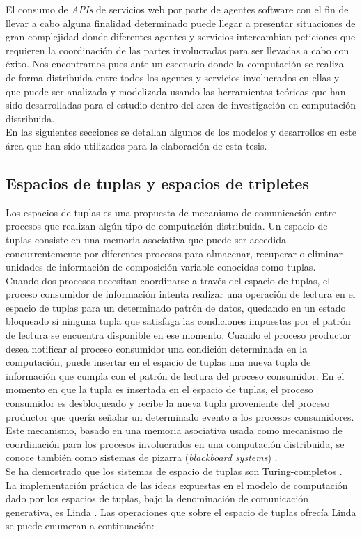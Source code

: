 El consumo de \textit{APIs} de servicios web por parte de agentes software con el fin de llevar a cabo alguna finalidad determinado puede llegar a presentar situaciones de gran complejidad donde diferentes agentes y servicios intercambian peticiones que requieren la coordinaci\'on de las partes involucradas para ser llevadas a cabo con \'exito. Nos encontramos pues ante un escenario donde la computaci\'on se realiza de forma distribuida entre todos los agentes y servicios involucrados en ellas y que puede ser analizada y modelizada usando las herramientas te\'oricas que han sido desarrolladas para el estudio dentro del area de investigaci\'on en computaci\'on distribuida.\\
En las siguientes secciones se detallan algunos de los modelos y desarrollos en este \'area que han sido utilizados para la elaboraci\'on de esta tesis.\\

\subsection{Espacios de tuplas y espacios de tripletes}

Los espacios de tuplas \cite{bussler2005minimal} es una propuesta de mecanismo de comunicaci\'on entre procesos que realizan alg\'un tipo de computaci\'on distribuida. Un espacio de tuplas consiste en una memoria asociativa que puede ser accedida concurrentemente por diferentes procesos para almacenar, recuperar o eliminar unidades de informaci\'on de composici\'on variable conocidas como tuplas.\\
Cuando dos procesos necesitan coordinarse a trav\'es del espacio de tuplas, el proceso consumidor de informaci\'on intenta realizar una operaci\'on de lectura en el espacio de tuplas para un determinado patr\'on de datos, quedando en un estado bloqueado si ninguna tupla que satisfaga las condiciones impuestas por el patr\'on de lectura se encuentra disponible en ese momento. Cuando el proceso productor desea notificar al proceso consumidor una condici\'on determinada en la computaci\'on, puede insertar en el espacio de tuplas una nueva tupla de informaci\'on que cumpla con el patr\'on de lectura del proceso consumidor. En el momento en que la tupla es insertada en el espacio de tuplas, el proceso consumidor es desbloqueado y recibe la nueva tupla proveniente del proceso productor que quer\'ia se\~nalar un determinado evento a los procesos consumidores. Este mecanismo, basado en una memoria asociativa usada como mecanismo de coordinaci\'on para los procesos involucrados en una computaci\'on distribuida, se conoce tambi\'en como sistemas de pizarra (\textit{blackboard systems}) \cite{nii1986blackboard}.\\
Se ha demostrado que los sistemas de espacio de tuplas son Turing-completos \cite{busi2000expressiveness}. La implementaci\'on pr\'actica de las ideas expuestas en el modelo de computaci\'on dado por los espacios de tuplas, bajo la denominaci\'on de comunicaci\'on generativa, es Linda \cite{linda}. Las operaciones que sobre el espacio de tuplas ofrec\'ia Linda se puede enumeran a continuaci\'on:\\


